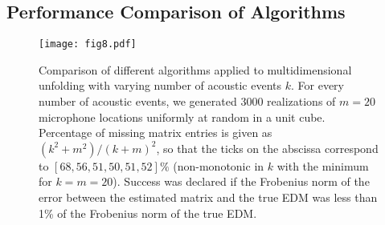 \documentclass[10pt,double]{IEEEtran}
\newcommand{\rev}[1]{{#1}}
\begin{document}
\subsection{Performance Comparison of Algorithms} \label{sub:performance_comparison_of_algorithms}



\begin{figure}[t!]
\centering
   \texttt{[image: fig8.pdf]}
   \caption{Comparison of different algorithms applied to multidimensional
   unfolding with varying number of acoustic events $k$. For every number of
   acoustic events, we generated 3000 realizations of $m = 20$ microphone
   locations uniformly at random in a unit cube. \rev{Percentage of missing
   matrix entries is given as $(k^2 + m^2) / (k + m)^2$, so that the ticks on
   the abscissa correspond to $[68,56,51,50,51,52]\%$ (non-monotonic in $k$
   with the minimum for $k=m=20$).} Success was declared if the Frobenius norm of
   the error between the estimated matrix and the true EDM was less than 1\%
   of the Frobenius norm of the true EDM.}
   \label{fig:success_mdu}
\end{figure}
\end{document}

